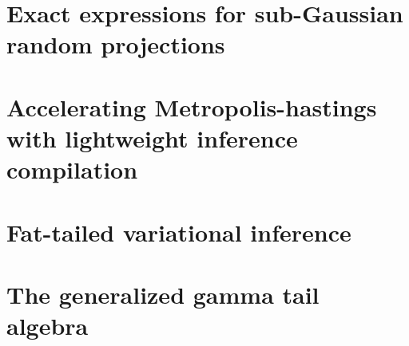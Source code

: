 \documentclass[oldfontcommands]{ucbthesis}
\begin{document}
\chapter{Exact expressions for sub-Gaussian random projections}
\label{ch:projections}



\chapter{Accelerating Metropolis-hastings with lightweight inference compilation}
\label{ch:lic}


\chapter{Fat-tailed variational inference}
\label{ch:ftvi}


\chapter{The generalized gamma tail algebra}
\label{ch:hta}

\end{document}
